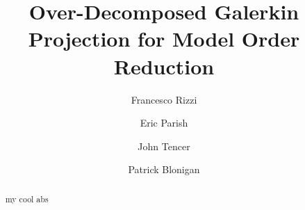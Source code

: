 \documentclass[3p,computermodern,10pt]{elsarticle}
\begin{document}
\begin{frontmatter}

\title{Over-Decomposed Galerkin Projection for Model Order Reduction}
\author[a]{Francesco Rizzi}
\author[b]{Eric Parish}
\author[c]{John Tencer}
\author[b]{Patrick Blonigan}
\address[a]{NexGen Analytics}
\address[b]{Sandia Livermore}
\address[c]{Sandia Albuquerque}


\begin{abstract}
my cool abs
\end{abstract}

\end{frontmatter}





\clearpage
\begin{appendix}

\end{appendix}


\end{document}
